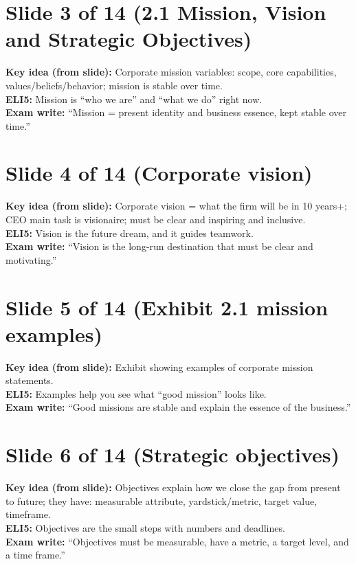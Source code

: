 \documentclass[11pt,a4paper]{article}
\begin{document}
\section*{Slide 3 of 14 (2.1 Mission, Vision and Strategic Objectives)}
\textbf{Key idea (from slide):} Corporate mission variables: scope, core capabilities, values/beliefs/behavior; mission is stable over time.\\
\textbf{ELI5:} Mission is ``who we are'' and ``what we do'' right now.\\
\textbf{Exam write:} ``Mission = present identity and business essence, kept stable over time.''

\section*{Slide 4 of 14 (Corporate vision)}
\textbf{Key idea (from slide):} Corporate vision = what the firm will be in 10 years+; CEO main task is visionaire; must be clear and inspiring and inclusive.\\
\textbf{ELI5:} Vision is the future dream, and it guides teamwork.\\
\textbf{Exam write:} ``Vision is the long-run destination that must be clear and motivating.''

\section*{Slide 5 of 14 (Exhibit 2.1 mission examples)}
\textbf{Key idea (from slide):} Exhibit showing examples of corporate mission statements.\\
\textbf{ELI5:} Examples help you see what ``good mission'' looks like.\\
\textbf{Exam write:} ``Good missions are stable and explain the essence of the business.''

\section*{Slide 6 of 14 (Strategic objectives)}
\textbf{Key idea (from slide):} Objectives explain how we close the gap from present to future; they have: measurable attribute, yardstick/metric, target value, timeframe.\\
\textbf{ELI5:} Objectives are the small steps with numbers and deadlines.\\
\textbf{Exam write:} ``Objectives must be measurable, have a metric, a target level, and a time frame.''
\end{document}
